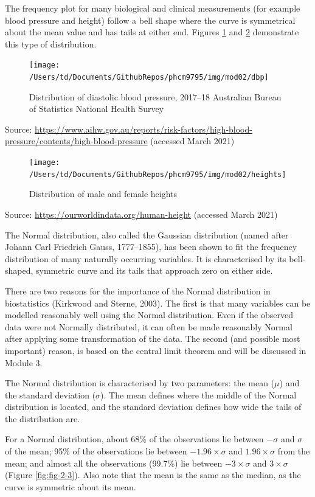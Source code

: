 \documentclass[
]{memoir}
\begin{document}
The frequency plot for many biological and clinical measurements (for example blood pressure and height) follow a bell shape where the curve is symmetrical about the mean value and has tails at either end. Figures \ref{fig:fig-2-1} and \ref{fig:fig-2-2} demonstrate this type of distribution.

\begin{figure}
\texttt{[image: /Users/td/Documents/GithubRepos/phcm9795/img/mod02/dbp]} \caption{Distribution of diastolic blood pressure, 2017–18 Australian Bureau of Statistics National Health Survey}\label{fig:fig-2-1}
\end{figure}

Source: \url{https://www.aihw.gov.au/reports/risk-factors/high-blood-pressure/contents/high-blood-pressure} (accessed March 2021)

\begin{figure}
\texttt{[image: /Users/td/Documents/GithubRepos/phcm9795/img/mod02/heights]} \caption{Distribution of male and female heights}\label{fig:fig-2-2}
\end{figure}

Source: \url{https://ourworldindata.org/human-height} (accessed March 2021)

The Normal distribution, also called the Gaussian distribution (named after Johann Carl Friedrich Gauss, 1777--1855), has been shown to fit the frequency distribution of many naturally occurring variables. It is characterised by its bell-shaped, symmetric curve and its tails that approach zero on either side.

There are two reasons for the importance of the Normal distribution in biostatistics (Kirkwood and Sterne, 2003). The first is that many variables can be modelled reasonably well using the Normal distribution. Even if the observed data were not Normally distributed, it can often be made reasonably Normal after applying some transformation of the data. The second (and possible most important) reason, is based on the central limit theorem and will be discussed in Module 3.

The Normal distribution is characterised by two parameters: the mean (\(\mu\)) and the standard deviation (\(\sigma\)). The mean defines where the middle of the Normal distribution is located, and the standard deviation defines how wide the tails of the distribution are.

For a Normal distribution, about 68\% of the observations lie between \(- \sigma\) and \(\sigma\) of the mean; 95\% of the observations lie between \(−1.96 \times \sigma\) and \(1.96 \times \sigma\) from the mean; and almost all the observations (99.7\%) lie between \(-3 \times \sigma\) and \(3 \times \sigma\) (Figure \ref{fig:fig-2-3}). Also note that the mean is the same as the median, as the curve is symmetric about its mean.
\end{document}
